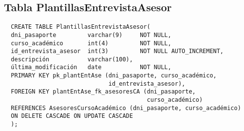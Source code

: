 \subsection{Tabla PlantillasEntrevistaAsesor}

\begin{verbatim}
  CREATE TABLE PlantillasEntrevistaAsesor(
  dni_pasaporte         varchar(9)     NOT NULL,
  curso_académico       int(4)         NOT NULL,
  id_entrevista_asesor  int(3)         NOT NULL AUTO_INCREMENT,
  descripción           varchar(100),
  última_modificación   date           NOT NULL,
  PRIMARY KEY pk_plantEntAse (dni_pasaporte, curso_académico,
                              id_entrevista_asesor),
  FOREIGN KEY plantEntAse_fk_asesoresCA (dni_pasaporte,
                                         curso_académico)
  REFERENCES AsesoresCursoAcadémico (dni_pasaporte, curso_académico)
  ON DELETE CASCADE ON UPDATE CASCADE
  );
\end{verbatim}